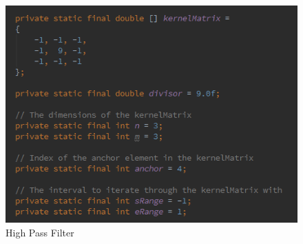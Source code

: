 \documentclass{article}
\begin{document}
%
% 
%
\begin{figure}[H]
\centering

  \includegraphics[width=0.9\linewidth]{res/algorithms/high_pass.png}
  
\caption{High Pass Filter}
\label{fig:alg_high_pass}
\end{figure}
\end{document}
